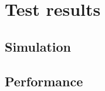 
\chapter{Test results}
\label{testing}



\section{Simulation}

\cite{Tjensvold07-GPenSim}



\section{Performance}


